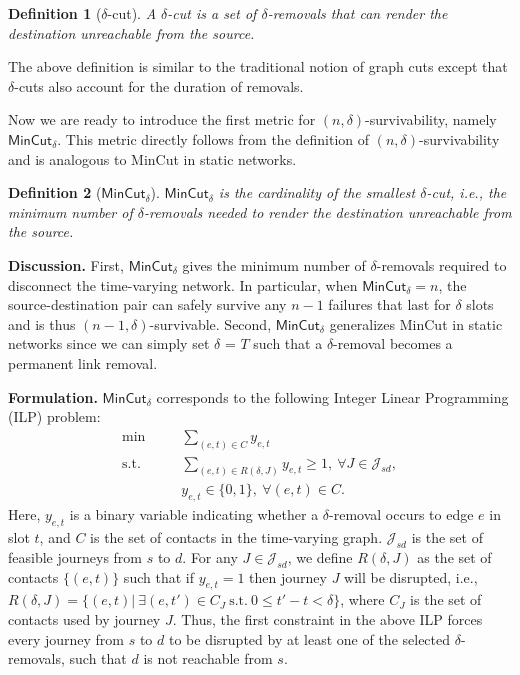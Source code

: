 \documentclass[10pt, conference, letterpaper]{IEEEtran}
\newtheorem{definition}{Definition}
\begin{document}
\begin{definition}[{$\delta$-cut}]
A $\delta$-cut  is a set of $\delta$-removals that can render the destination unreachable from the source.
\end{definition}

\noindent  The above definition is similar to the traditional notion of graph cuts except that $\delta$-cuts also account for the duration of removals.

Now we are ready to introduce the first metric for $(n,\delta)$-survivability, namely $\mathsf{MinCut_{\delta}}$. This metric directly follows from the definition of $(n,\delta)$-survivability and is analogous to MinCut in static networks.

\begin{definition}[\textbf{${\mathsf{MinCut_{\delta}}}$}]\label{mincut_def}
$\mathsf{MinCut_{\delta}}$ is the cardinality of the smallest $\delta$-cut, i.e., the minimum number of $\delta$-removals needed to render the destination unreachable from the source.
\end{definition}

\noindent \textbf{Discussion.} First, $\mathsf{MinCut_{\delta}}$ gives the minimum number of $\delta$-removals required to disconnect the time-varying network.
In particular, when $\mathsf{MinCut_{\delta}}=n$, the source-destination pair can safely survive any $n-1$ failures that last for $\delta$ slots and is thus $(n-1,\delta)$-survivable.
Second, $\mathsf{MinCut_{\delta}}$ generalizes MinCut in static networks since we can simply set $\delta$ = $T$ such that a $\delta$-removal becomes a permanent link removal.



\vspace{1mm}

\noindent \textbf{Formulation.} $\mathsf{MinCut_{\delta}}$ corresponds to the following Integer Linear Programming (ILP) problem:
\[
\begin{split}
\min~~~~~~~~&\sum_{(e,t)\in C} y_{e,t}\\
\text{s.t.}~~~~~~~~&\sum_{(e,t)\in R(\delta,J)}y_{e,t}\ge 1,~\forall J\in\mathcal{J}_{sd},\\
               &y_{e,t}\in \{0,1\},~\forall (e,t)\in C.
\end{split}
\]
Here, $y_{e,t}$ is a binary variable indicating whether a $\delta$-removal occurs to edge $e$ in slot $t$, and $C$ is the set of contacts in the time-varying graph. $\mathcal{J}_{sd}$ is the set of feasible journeys from $s$ to $d$. For any $J\in \mathcal{J}_{sd}$, we define $R(\delta,J)$ as the set of contacts $\{(e,t)\}$ such that if $y_{e,t}=1$ then journey $J$ will be disrupted, i.e., $R(\delta,J)=\{(e,t)| ~\exists (e,t')\in C_J~\text{s.t.}~0\le t'-t<\delta\}$, where $C_J$ is the set of contacts used by journey $J$. Thus, the first constraint in the above ILP forces every journey from $s$ to $d$ to be disrupted by at least one of the selected $\delta$-removals, such that $d$ is not reachable from $s$.
\end{document}
